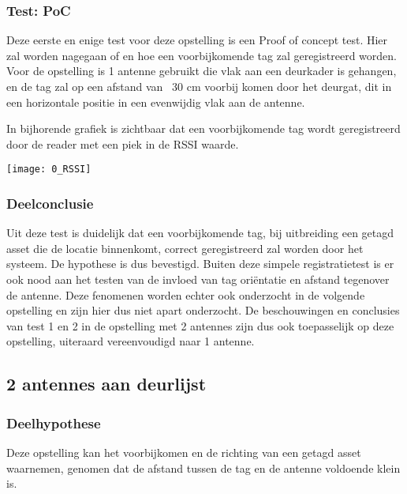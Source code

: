 \subsubsection{Test: PoC}
Deze eerste en enige test voor deze opstelling is een Proof of concept test. Hier zal worden nagegaan of en hoe een voorbijkomende tag zal geregistreerd worden. Voor de opstelling is 1 antenne gebruikt die vlak aan een deurkader is gehangen, en de tag zal op een afstand van ~30 cm voorbij komen door het deurgat, dit in een horizontale positie in een evenwijdig vlak aan de antenne.

\begin{minipage}{0.55\textwidth}
In bijhorende grafiek is zichtbaar dat een voorbijkomende tag wordt geregistreerd door de reader met een piek in de RSSI waarde.
\end{minipage}
\hfill
\begin{minipage}{0.42\textwidth}
	\texttt{[image: 0\_RSSI]}
\end{minipage}

\subsubsection{Deelconclusie}
Uit deze test is duidelijk dat een voorbijkomende tag, bij uitbreiding een getagd asset die de locatie binnenkomt, correct geregistreerd zal worden door het systeem. De hypothese is dus bevestigd. Buiten deze simpele registratietest is er ook nood aan het testen van de invloed van tag oriëntatie en afstand tegenover de antenne. Deze fenomenen worden echter ook onderzocht in de volgende opstelling en zijn hier dus niet apart onderzocht. De beschouwingen en conclusies van test 1 en 2 in de opstelling met 2 antennes zijn dus ook toepasselijk op deze opstelling, uiteraard vereenvoudigd naar 1 antenne.

\subsection{2 antennes aan deurlijst}
\subsubsection{Deelhypothese}
Deze opstelling kan het voorbijkomen en de richting van een getagd asset waarnemen, genomen dat de afstand tussen de tag en de antenne voldoende klein is.


